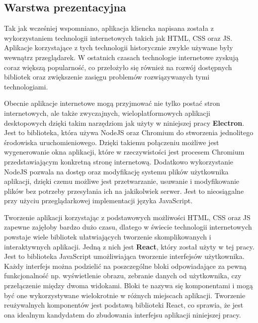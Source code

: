 \subsection{Warstwa prezentacyjna}

Tak jak wcześniej wspomniano, aplikacja kliencka napisana została z wykorzystaniem technologii
internetowych takich jak HTML, CSS oraz JS. Aplikacje korzystające z tych technologii historycznie
zwykle używane były wewnątrz przeglądarek. W ostatnich czasach technologie internetowe zyskują
coraz większą popularnoś\'c, co przełożyło się również na rozwój dostępnych bibliotek oraz zwiększenie
zasięgu problemów rozwiązywanych tymi technologiami.

Obecnie aplikacje internetowe mogą przyjmowa\'c nie tylko posta\'c stron internetowych, ale także
zwyczajnych, wieloplatformowych aplikacji desktopowych dzięki takim narzędziom jak użyty w niniejszej
pracy \textbf{Electron}. Jest to biblioteka, która używa NodeJS oraz Chromium do stworzenia jednolitego
środowiska uruchomieniowego. Dzięki takiemu połączeniu możliwe jest wygenerowanie okna aplikacji, które
w rzeczywistości jest procesem Chromium przedstawiającym konkretną stronę internetową. Dodatkowo wykorzystanie
NodeJS pozwala na dostęp oraz modyfikację systemu plików użytkownika aplikacji, dzięki czemu możliwe jest przetwarzanie,
usuwanie i modyfikowanie plików bez potrzeby przesyłania ich na jakikolwiek serwer. Jest to nieosiągalne
przy użyciu przeglądarkowej implementacji języka JavaScript.\newline

Tworzenie aplikacji korzystając z podstawowych możliwości HTML, CSS oraz JS zapewne zajęłoby
bardzo dużo czasu, dlatego w świecie technologii internetowych powstaje wiele bibliotek
ułatwiających tworzenie skomplikowanych i interaktywnych aplikacji. Jedną z nich jest
\textbf{React}, który został użyty w tej pracy. Jest to biblioteka JavaScript umożliwiająca
tworzenie interfejsów użytkownika. Każdy interfejs można podzieli\'c na poszczególne bloki
odpowiadające za pewną funkcjonalnoś\'c np. wyświetlenie obrazu, zebranie danych od użytkownika,
czy przełączenie między dwoma widokami. Bloki te nazywa się komponentami i mogą by\'c one wykorzystywane
wielokrotnie w różnych miejscach aplikacji. Tworzenie reużywalnych komponentów jest podstawą
biblioteki React, co sprawia, że jest ona idealnym kandydatem do zbudowania interfejsu aplikacji
niniejszej pracy.\newline

